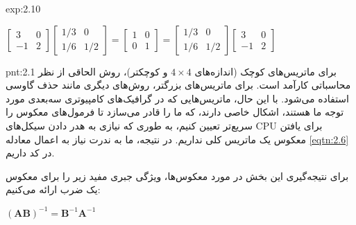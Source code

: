 {\begin{spacing}{1.5}
\begin{example}{exp:2.10}
            \begin{center}
                $\begin{bmatrix}
                     3  & 0 \\
                     -1 & 2
                \end{bmatrix}\begin{bmatrix}
                                 1/3 & 0   \\
                                 1/6 & 1/2
                \end{bmatrix}=\begin{bmatrix}
                                  1 & 0 \\
                                  0 & 1
                \end{bmatrix}=\begin{bmatrix}
                                  1/3 & 0   \\
                                  1/6 & 1/2
                \end{bmatrix}\begin{bmatrix}
                                 3  & 0 \\
                                 -1 & 2
                \end{bmatrix}$
            \end{center}
        \end{example}

        \begin{point}{pnt:2.1}
            \Large
            برای ماتریس‌های کوچک (اندازه‌های $4\times 4$ و کوچکتر)، روش الحاقی از نظر محاسباتی کارآمد است.
            برای ماتریس‌های بزرگتر، روش‌های دیگری مانند حذف گاوسی استفاده می‌شود.
            با این حال، ماتریس‌هایی که در گرافیک‌های کامپیوتری سه‌بعدی مورد توجه ما هستند،
            اشکال خاصی دارند، که ما را قادر می‌سازد تا فرمول‌های معکوس را سریع‌تر تعیین کنیم،
            به طوری که نیازی به هدر دادن سیکل‌های CPU برای یافتن معکوس یک ماتریس کلی نداریم.
            در نتیجه، ما به ندرت نیاز به اعمال معادله \ref{eqtn:2.6} در کد داریم.
        \end{point}

        برای نتیجه‌گیری این بخش در مورد معکوس‌ها، ویژگی جبری مفید زیر را برای معکوس یک ضرب ارائه می‌کنیم:

        \begin{center}
            $(\textbf{AB})^{-1}=\textbf{B}^{-1}\textbf{A}^{-1}$
        \end{center}


\end{spacing}}
